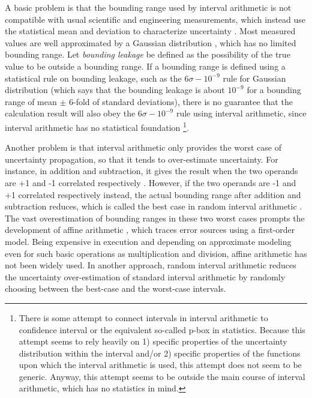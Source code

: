 \documentclass[twoside]{article}
\numberwithin{equation}{section}
\begin{document}
A basic problem is that the bounding range used by interval arithmetic is not compatible with usual scientific and engineering measurements, which instead use the statistical mean and deviation to characterize uncertainty \cite{Statistical_Methods}\cite{Precisions_Physical_Measurements}.  
Most measured values are well approximated by a Gaussian distribution \cite{Statistical_Methods}\cite{Precisions_Physical_Measurements}\cite{Probability_Statistics}, which has no limited bounding range.  
Let \emph{bounding leakage} be defined as the possibility of the true value to be outside a bounding range.  
If a bounding range is defined using a statistical rule on bounding leakage, such as the $6\sigma-10^{-9}$ rule for Gaussian distribution \cite{Probability_Statistics} (which says that the bounding leakage is about $10^{-9}$ for a bounding range of mean $\pm$ 6-fold of standard deviations), there is no guarantee that the calculation result will also obey the $6\sigma-10^{-9}$ rule using interval arithmetic, since interval arithmetic has no statistical foundation
\footnote{
There is some attempt \cite{Statistics_For_Interval_Arithmetic} to connect intervals in interval arithmetic to confidence interval or the equivalent so-called p-box in statistics. 
Because this attempt seems to rely heavily on 1) specific properties of the uncertainty distribution within the interval and/or 2) specific properties of the functions upon which the interval arithmetic is used, this attempt does not seem to be generic. 
Anyway, this attempt seems to be outside the main course of interval arithmetic, which has no statistics in mind.
}.  

Another problem is that interval arithmetic only provides the worst case of uncertainty propagation, so that it tends to over-estimate uncertainty.  
For instance, in addition and subtraction, it gives the result when the two operands are +1 and -1 correlated respectively \cite{Affine_Arithmetic}.  
However, if the two operands are -1 and +1 correlated respectively instead, the actual bounding range after addition and subtraction reduces, which is called the best case in random interval arithmetic \cite{Random_Interval_Arithmetic}.  
The vast overestimation of bounding ranges in these two worst cases prompts the development of affine arithmetic \cite{Affine_Arithmetic}\cite{Affine_Arithmetic_book}, which traces error sources using a first-order model.  
Being expensive in execution and depending on approximate modeling even for such basic operations as multiplication and division, affine arithmetic has not been widely used.  
In another approach, random interval arithmetic \cite{Random_Interval_Arithmetic} reduces the uncertainty over-estimation of standard interval arithmetic by randomly choosing between the best-case and the worst-case intervals.  
\end{document}
